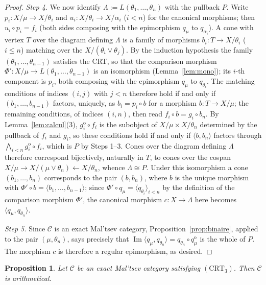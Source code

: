 \documentclass[11pt,a4paper]{article}
\theoremstyle{plain}
\newtheorem{proposition}[theoreme]{Proposition}
\theoremstyle{definition}
\theoremstyle{remark}
\theoremstyle{plain}
\newcommand{\C}{\mathcal{C}}
\newcommand{\im}{\operatorname{Im}}
\newcommand{\op}{\mathrm{o}}
\begin{document}
\begin{proof}
\emph{Step 4.} We now identify $\Lambda := L(\theta_1,\dots,\theta_n)$
with the pullback $P$. Write $p_i \colon X/\mu \to X/\theta_i$ and
$u_i \colon X/\theta_i \to X/\alpha_i$ ($i < n$) for the canonical
morphisms; then $u_i \circ p_i = f_i$ (both sides composing with the epimorphism $q_\mu$
to $q_{\alpha_i}$). A cone with vertex $T$ over the diagram defining
$\Lambda$ is a family of morphisms $b_i \colon T \to X/\theta_i$
($i \le n$) matching over the $X/(\theta_i \vee \theta_j)$. By the
induction hypothesis the family $(\theta_1,\dots,\theta_{n-1})$ satisfies
the CRT, so that the comparison morphism
$\Phi' \colon X/\mu \to L(\theta_1,\dots,\theta_{n-1})$ is an isomorphism
(Lemma~\ref{lem:mono}); its $i$-th component is $p_i$, both composing
with the epimorphism $q_\mu$ to $q_{\theta_i}$. The matching conditions of indices
$(i,j)$ with $j < n$ therefore hold if and only if $(b_1, \dots, b_{n-1})$ factors,
uniquely, as $b_i = p_i \circ b$ for a morphism $b \colon T \to X/\mu$;
the remaining conditions, of indices $(i,n)$, then read
$f_i \circ b = g_i \circ b_n$. By Lemma~\ref{lem:calcul}(3),
$g_i^{\op} \circ f_i$ is the subobject of $X/\mu \times X/\theta_n$
determined by the pullback of $f_i$ and $g_i$, so these conditions hold if
and only if $\langle b, b_n \rangle$ factors through
$\bigwedge_{i<n} g_i^{\op} \circ f_i$, which is $P$ by Steps 1--3. Cones
over the diagram defining $\Lambda$ therefore correspond bijectively,
naturally in $T$, to cones over the cospan
$X/\mu \to X/(\mu \vee \theta_n) \leftarrow X/\theta_n$, whence
$\Lambda \cong P$. Under this isomorphism a cone $(b_1, \dots, b_n)$
corresponds to the pair $(b, b_n)$, where $b$ is the unique morphism with
$\Phi' \circ b = \langle b_1, \dots, b_{n-1} \rangle$; since
$\Phi' \circ q_\mu = \langle q_{\theta_i} \rangle_{i<n}$ by the 
definition of the comparison morphism $\Phi'$, the canonical morphism
$c \colon X \to \Lambda$ here becomes $\langle q_\mu, q_{\theta_n} \rangle$.

\emph{Step 5.} Since $\mathcal C$ is an exact Mal'tsev category, Proposition~\ref{prop:binaire}, applied to the pair
$(\mu, \theta_n)$, says precisely that
$\im \langle q_\mu, q_{\theta_n} \rangle
= q_{\theta_n} \circ q_\mu^{\op}$ is the whole of $P$. The morphism $c$ is therefore a regular epimorphism, as desired.
\end{proof}

\begin{proposition}\label{prop:crt-arith}
Let $\C$ be an exact Mal'tsev category satisfying $(\mathrm{CRT}_3)$.
Then $\C$ is arithmetical.
\end{proposition}
\end{document}
